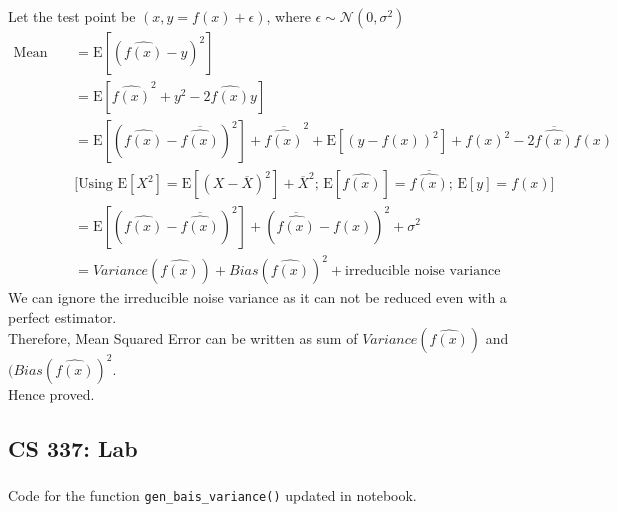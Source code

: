 \documentclass[12pt, fleqn]{article}
\begin{document}
\subsubsection{}
Let the test point be $(x, y = f(x) + \epsilon)$, where $\epsilon \sim \mathcal{N}(0, \sigma^2)$
\begin{equation*}
  \begin{aligned}
    \text{Mean Squared Error} & = \text{E} [ (\hat{f(x)} - y)^2 ]                                                                                                                                      \\
                              & = \text{E} [ \hat{f(x)}^2 + y^2 - 2 \hat{f(x)} y ]                                                                                                                     \\
                              & = \text{E} [(\hat{f(x)} - \overline{\hat{f(x)}})^2] + \overline{\hat{f(x)}}^2 + \text{E} [(y - f(x))^2] + f(x)^2 - 2 \overline{\hat{f(x)}} f(x)                        \\
                              & \bigg[ \text{Using $\text{E} [X^2] = \text{E} [(X - \overline{X})^2] + \overline{X}^2$; $\text{E} [\hat{f(x)}] = \overline{\hat{f(x)}}$; $\text{E} [y] = f(x)$} \bigg] \\
                              & = \text{E} [(\hat{f(x)} - \overline{\hat{f(x)}})^2] + (\overline{\hat{f(x)}} - f(x))^2 + \sigma^2                                                                      \\
                              & = Variance(\hat{f(x)}) + Bias(\hat{f(x)})^2 + \text{irreducible noise variance}
  \end{aligned}
\end{equation*}
We can ignore the irreducible noise variance as it can not be reduced even with a perfect estimator. \\
Therefore, Mean Squared Error can be written as sum of $Variance(\hat{f(x)})$ and $(Bias(\hat{f(x)})^2$. \\
Hence proved.

\subsection{CS 337: Lab}
\subsubsection{}
Code for the function \verb!gen_bais_variance()! updated in notebook.
\end{document}

